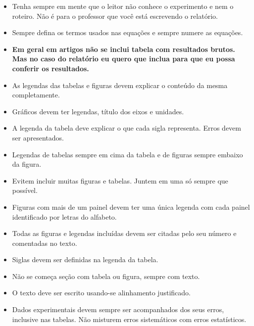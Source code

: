 \documentclass[reprint,amsmath,amssymb,aps,prl,floatfix,onecolumn]{revtex4-2}
\begin{document}
\begin{itemize}
	
	\item Tenha sempre em mente que o leitor não conhece o experimento e nem o roteiro. Não é para o professor que você está escrevendo o relatório. 
	
	\item Sempre defina os termos usados nas equações e sempre numere as equações. 
	
	\item \textbf{Em geral em artigos não se inclui tabela com resultados brutos.} \textbf{Mas no caso do relatório eu quero que inclua para que eu possa conferir os resultados.} 
	
	\item As legendas das tabelas e figuras devem explicar o conteúdo da mesma completamente. 
	
	\item Gráficos devem ter legendas, título dos eixos e unidades.
	
	\item A legenda da tabela deve explicar o que cada sigla representa. Erros devem ser apresentados.
	
	\item Legendas de tabelas sempre em cima da tabela e  de figuras sempre embaixo da figura.
	
	\item Evitem incluir muitas figuras e tabelas. Juntem em uma só sempre que possível. 
	
	\item Figuras com mais de um painel devem ter uma única legenda com cada painel identificado por letras do alfabeto. 
	
    \item Todas as figuras e legendas incluídas devem ser citadas pelo seu número e comentadas no texto. 

	\item Siglas devem ser definidas na legenda da tabela. 

	\item Não se começa seção com tabela ou figura, sempre com texto.
	
	\item O texto deve ser escrito usando-se alinhamento justificado. 
	
	\item Dados experimentais devem sempre ser acompanhados dos seus erros, inclusive nas tabelas. Não misturem erros sistemáticos com erros estatísticos. 
	

\end{itemize}
\end{document}
